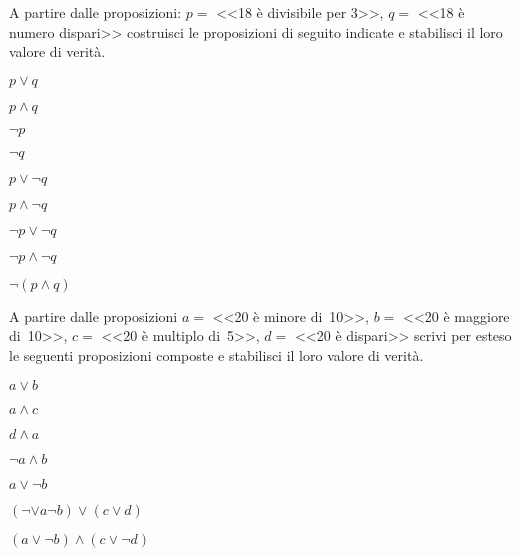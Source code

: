 \begin{esercizio}[\Ast]
\label{ese:6.3}
A partire dalle proposizioni: $ p = $ <<18 è divisibile per 3>>, $ q = $ <<18
è numero dispari>> costruisci le proposizioni di seguito indicate e stabilisci il loro valore di verità.
\begin{multicols}{3}
\TabPositions{1.5cm}
\begin{enumeratea}
 \item $p\vee q$	\tab\quad\boxV\quad\boxF
 \item $p\wedge q$	\tab\quad\boxV\quad\boxF
 \item $\neg p$	\tab\quad\boxV\quad\boxF
 \item $\neg q$	\tab\quad\boxV\quad\boxF
 \item $p\vee \neg q$	\tab\quad\boxV\quad\boxF
 \item $p\wedge \neg q$	\tab\quad\boxV\quad\boxF
 \item $\neg p\vee \neg q$	\tab\quad\boxV\quad\boxF
 \item $\neg p\wedge \neg q$	\tab\quad\boxV\quad\boxF
 \item $\neg (p\wedge q)$	\tab\quad\boxV\quad\boxF
\end{enumeratea}
\end{multicols}
\end{esercizio}

\begin{esercizio}
\label{ese:6.4}
A partire dalle proposizioni $ a = $ <<20 è minore di~10>>, $ b = $ <<20 è maggiore
di~10>>, $ c = $ <<20 è multiplo di~5>>, $ d = $ <<20 è dispari>> scrivi per esteso le
seguenti proposizioni composte e stabilisci il loro valore di verità.
\begin{multicols}{2}
\TabPositions{3.2cm}
\begin{enumeratea}
 \item $a\vee b$	\tab\qquad\boxV\qquad\boxF
 \item $a\wedge c$	\tab\qquad\boxV\qquad\boxF
 \item $d\wedge a$	\tab\qquad\boxV\qquad\boxF
 \item $\neg a\wedge b$	\tab\qquad\boxV\qquad\boxF
 \item $a\vee \neg b$	\tab\qquad\boxV\qquad\boxF
 \item $(\neg\vee a\neg b)\vee (c\vee d)$	\tab\qquad\boxV\qquad\boxF
 \item $(a\vee \neg b)\wedge (c\vee \neg d)$	\tab\qquad\boxV\qquad\boxF
\end{enumeratea}
\end{multicols}
\end{esercizio}

